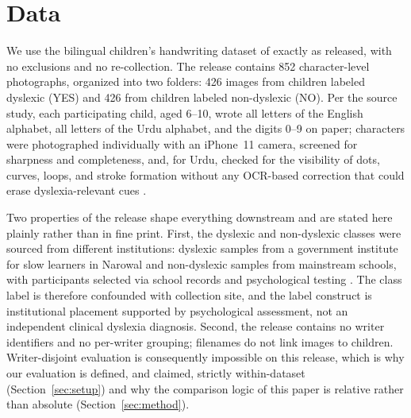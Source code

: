 \documentclass[11pt,a4paper]{article}
\begin{document}
\section{Data}
\label{sec:data}

We use the bilingual children's handwriting dataset of
\citet{kashif2026} exactly as released, with no exclusions and no
re-collection. The release contains 852 character-level photographs,
organized into two folders: 426 images from children labeled dyslexic
(YES) and 426 from children labeled non-dyslexic (NO). Per the source
study, each participating child, aged 6--10, wrote all letters of the
English alphabet, all letters of the Urdu alphabet, and the digits
0--9 on paper; characters were photographed individually with an
iPhone~11 camera, screened for sharpness and completeness, and, for
Urdu, checked for the visibility of dots, curves, loops, and stroke
formation without any OCR-based correction that could erase
dyslexia-relevant cues \citep{kashif2026}.

Two properties of the release shape everything downstream and are
stated here plainly rather than in fine print. First, the dyslexic
and non-dyslexic classes were sourced from different institutions:
dyslexic samples from a government institute for slow learners in
Narowal and non-dyslexic samples from mainstream schools, with
participants selected via school records and psychological testing
\citep{kashif2026}. The class label is therefore confounded with
collection site, and the label construct is institutional placement
supported by psychological assessment, not an independent clinical
dyslexia diagnosis. Second, the release contains no writer
identifiers and no per-writer grouping; filenames do not link images
to children. Writer-disjoint evaluation is consequently impossible on
this release, which is why our evaluation is defined, and claimed,
strictly within-dataset (Section~\ref{sec:setup}) and why the
comparison logic of this paper is relative rather than absolute
(Section~\ref{sec:method}).
\end{document}
